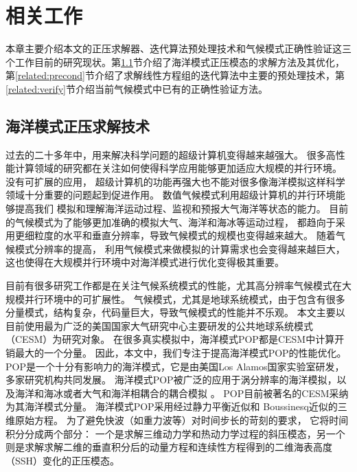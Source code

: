 \chapter{相关工作}
\label{cha:related}
本章主要介绍本文的正压求解器、迭代算法预处理技术和气候模式正确性验证这三个工作目前的研究现状。第\ref{solver:Backgroud}节介绍了海洋模式正压模态的求解方法及其优化，第\ref{related:precond}节介绍了求解线性方程组的迭代算法中主要的预处理技术，第\ref{related:verify}节介绍当前气候模式中已有的正确性验证方法。


\section{海洋模式正压求解技术}
\label{solver:Backgroud} 

过去的二十多年中，用来解决科学问题的超级计算机变得越来越强大。 
很多高性能计算领域的研究都在关注如何使得科学应用能够更加适应大规模的并行环境。 
没有可扩展的应用， 超级计算机的功能再强大也不能对很多像海洋模拟这样科学领域十分重要的问题起到促进作用。 
数值气候模式利用超级计算机的并行环境能够提高我们 模拟和理解海洋运动过程、监视和预报大气海洋等状态的能力。 
目前的气候模式为了能够更加准确的模拟大气、海洋和海冰等运动过程， 都趋向于采用更细粒度的水平和垂直分辨率，导致气候模式的规模也变得越来越大。 
随着气候模式分辨率的提高， 利用气候模式来做模拟的计算需求也会变得越来越巨大，这也使得在大规模并行环境中对海洋模式进行优化变得极其重要。 



目前有很多研究工作都是在关注气候系统模式的性能，尤其高分辨率气候模式在大规模并行环境中的可扩展性。 
气候模式，尤其是地球系统模式，由于包含有很多分量模式，结构复杂，代码量巨大，导致气候模式的性能并不乐观。 
本文主要以目前使用最为广泛的美国国家大气研究中心主要研发的公共地球系统模式（CESM）为研究对象。
在很多真实模拟中，海洋模式POP都是CESM中计算开销最大的一个分量\cite{Worley:2011:PCE:2063384.2063457, dennis2012computational}。 
因此，本文中，我们专注于提高海洋模式POP的性能优化。 
POP是一个十分有影响力的海洋模式，它是由美国Los Alamos国家实验室研发，多家研究机构共同发展。
海洋模式POP被广泛的应用于涡分辨率的海洋模拟\cite{mcclean2002eulerian, stark2004towards}，以及海洋和海冰或者大气和海洋相耦合的耦合模拟  \cite{May2002preliminary}。 
POP目前被著名的CESM采纳为其海洋模式分量。  
海洋模式POP采用经过静力平衡近似和  Boussinesq近似的三维原始方程。 
为了避免快波（如重力波等）对时间步长的苛刻的要求， 它将时间积分分成两个部分： 一个是求解三维动力学和热动力学过程的斜压模态，另一个则是求解求解二维的垂直积分后的动量方程和连续性方程得到的二维海表高度（SSH）变化的正压模态\cite{smith2010parallel}。

